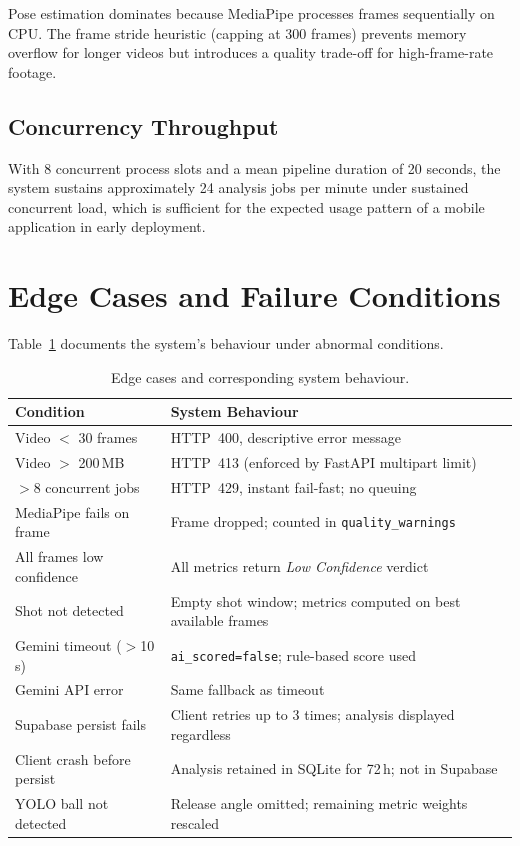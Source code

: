 Pose estimation dominates because MediaPipe processes frames sequentially on CPU. The frame stride heuristic (capping at 300 frames) prevents memory overflow for longer videos but introduces a quality trade-off for high-frame-rate footage.

\subsection{Concurrency Throughput}

With 8 concurrent process slots and a mean pipeline duration of 20 seconds, the system sustains approximately 24 analysis jobs per minute under sustained concurrent load, which is sufficient for the expected usage pattern of a mobile application in early deployment.

\section{Edge Cases and Failure Conditions}
\label{sec:edge_cases}

Table~\ref{tab:edge_cases} documents the system's behaviour under abnormal conditions.

\begin{table}[H]
  \centering
  \caption{Edge cases and corresponding system behaviour.}
  \label{tab:edge_cases}
  \begin{tabularx}{\textwidth}{l>{\raggedright\arraybackslash}X}
    \toprule
    \textbf{Condition} & \textbf{System Behaviour} \\
    \midrule
    Video $<$ 30 frames & HTTP~400, descriptive error message \\
    Video $>$ 200\,MB & HTTP~413 (enforced by FastAPI multipart limit) \\
    $>$8 concurrent jobs & HTTP~429, instant fail-fast; no queuing \\
    MediaPipe fails on frame & Frame dropped; counted in \lstinline|quality_warnings| \\
    All frames low confidence & All metrics return \textit{Low Confidence} verdict \\
    Shot not detected & Empty shot window; metrics computed on best available frames \\
    Gemini timeout ($>$10\,s) & \lstinline|ai_scored=false|; rule-based score used \\
    Gemini API error & Same fallback as timeout \\
    Supabase persist fails & Client retries up to 3 times; analysis displayed regardless \\
    Client crash before persist & Analysis retained in SQLite for 72\,h; not in Supabase \\
    YOLO ball not detected & Release angle omitted; remaining metric weights rescaled \\
    \bottomrule
  \end{tabularx}
\end{table}


